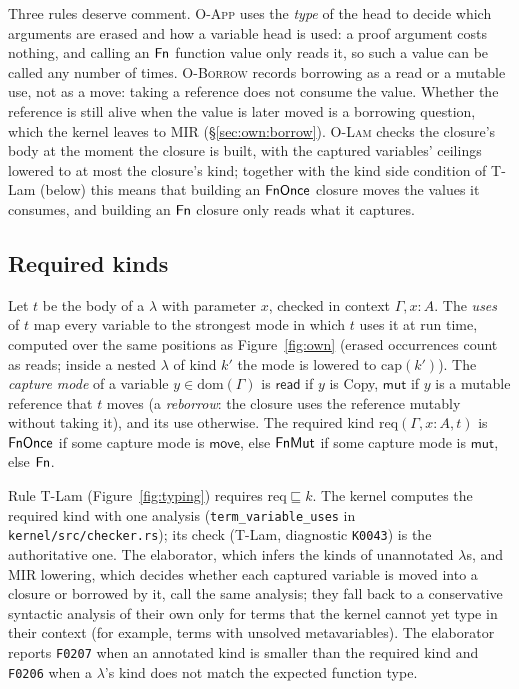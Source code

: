 Three rules deserve comment.
\textsc{O-App} uses the \emph{type} of the head to decide which arguments are erased and how a variable head is used: a proof argument costs nothing, and calling an $\mathsf{Fn}$ function value only reads it, so such a value can be called any number of times.
\textsc{O-Borrow} records borrowing as a read or a mutable use, not as a move: taking a reference does not consume the value.
Whether the reference is still alive when the value is later moved is a borrowing question, which the kernel leaves to MIR (\S\ref{sec:own:borrow}).
\textsc{O-Lam} checks the closure's body at the moment the closure is built, with the captured variables' ceilings lowered to at most the closure's kind; together with the kind side condition of T-Lam (below) this means that building an $\mathsf{FnOnce}$ closure moves the values it consumes, and building an $\mathsf{Fn}$ closure only reads what it captures.

\subsection{Required kinds}\label{sec:own:kind}

\begin{definition}\label{def:req}
Let $t$ be the body of a $\lambda$ with parameter $x$, checked in context $\Gamma, x{:}A$.
The \emph{uses} of $t$ map every variable to the strongest mode in which $t$ uses it at run time, computed over the same positions as Figure~\ref{fig:own} (erased occurrences count as reads; inside a nested $\lambda$ of kind $k'$ the mode is lowered to $\mathrm{cap}(k')$).
The \emph{capture mode} of a variable $y \in \mathrm{dom}(\Gamma)$ is $\mathsf{read}$ if $y$ is Copy, $\mathsf{mut}$ if $y$ is a mutable reference that $t$ moves (a \emph{reborrow}: the closure uses the reference mutably without taking it), and its use otherwise.
The required kind $\mathrm{req}(\Gamma, x{:}A, t)$ is $\mathsf{FnOnce}$ if some capture mode is $\mathsf{move}$, else $\mathsf{FnMut}$ if some capture mode is $\mathsf{mut}$, else $\mathsf{Fn}$.
\end{definition}

Rule T-Lam (Figure~\ref{fig:typing}) requires $\mathrm{req} \sqsubseteq k$.
The kernel computes the required kind with one analysis (\texttt{term\_variable\_uses} in \texttt{kernel/src/checker.rs}); its check (T-Lam, diagnostic \texttt{K0043}) is the authoritative one.
The elaborator, which infers the kinds of unannotated $\lambda$s, and MIR lowering, which decides whether each captured variable is moved into a closure or borrowed by it, call the same analysis; they fall back to a conservative syntactic analysis of their own only for terms that the kernel cannot yet type in their context (for example, terms with unsolved metavariables).
The elaborator reports \texttt{F0207} when an annotated kind is smaller than the required kind and \texttt{F0206} when a $\lambda$'s kind does not match the expected function type.

